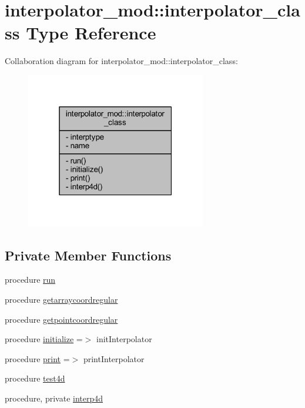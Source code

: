 \hypertarget{structinterpolator__mod_1_1interpolator__class}{}\section{interpolator\+\_\+mod\+:\+:interpolator\+\_\+class Type Reference}
\label{structinterpolator__mod_1_1interpolator__class}


Collaboration diagram for interpolator\+\_\+mod\+:\+:interpolator\+\_\+class\+:\nopagebreak
\begin{figure}[H]
\begin{center}
\leavevmode
\includegraphics[width=223pt]{structinterpolator__mod_1_1interpolator__class__coll__graph}
\end{center}
\end{figure}
\subsection*{Private Member Functions}
\begin{DoxyCompactItemize}
\item 
procedure \mbox{\hyperlink{structinterpolator__mod_1_1interpolator__class_a1080aca342174069db9c5639853d5dc0}{run}}
\item 
procedure \mbox{\hyperlink{structinterpolator__mod_1_1interpolator__class_ad95ae9cbdbc00c17ef2c463b58e23678}{getarraycoordregular}}
\item 
procedure \mbox{\hyperlink{structinterpolator__mod_1_1interpolator__class_ab712786f431ad1f76e5a48cbf4812083}{getpointcoordregular}}
\item 
procedure \mbox{\hyperlink{structinterpolator__mod_1_1interpolator__class_a6911f5a4e2cbe3fcd8fbfce906429436}{initialize}} =$>$ init\+Interpolator
\item 
procedure \mbox{\hyperlink{structinterpolator__mod_1_1interpolator__class_a4b3112a37f09901a223d8cc3d81be4dd}{print}} =$>$ print\+Interpolator
\item 
procedure \mbox{\hyperlink{structinterpolator__mod_1_1interpolator__class_a13fd2e0a083654c0c3961bccd2e39f3a}{test4d}}
\item 
procedure, private \mbox{\hyperlink{structinterpolator__mod_1_1interpolator__class_a150485e59a4b0edc41e730c116a37073}{interp4d}}
\end{DoxyCompactItemize}
